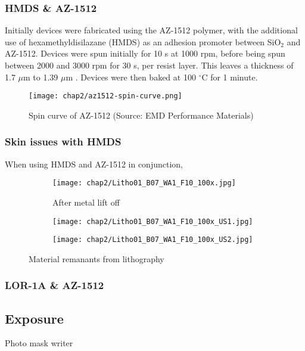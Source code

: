 \documentclass[../Matt_Gebert_Honours_Thesis.tex]{subfiles}
\begin{document}
	\subsubsection{HMDS \& AZ-1512}
		Initially devices were fabricated using the AZ-1512 polymer, with the additional use of hexamethyldisilazane (HMDS) as an adhesion promoter between SiO$_2$ and AZ-1512. Devices were spun initially for 10 s at 1000 rpm, before being spun between 2000 and 3000 rpm for 30 s, per resist layer. This leaves a thickness of 1.7 $\mu$m to 1.39 $\mu$m \cite{az1500_series}.
		Devices were then baked at 100 $^\circ$C for 1 minute.
	
	\begin{figure}[H]\label{fig:spin_curve_AZ-1512}
		\centering
		\texttt{[image: chap2/az1512-spin-curve.png]}
		\caption{Spin curve of AZ-1512 (Source: EMD Performance Materials\cite{az1500_series_spincurve})}
	\end{figure}
	
	\subsubsection{Skin issues with HMDS}
	When using HMDS and AZ-1512 in conjunction, 
	
	
	\begin{figure}[H]\label{fig:lithography_skins}
		\centering
		\begin{subfigure}[b]{0.3\textwidth}
			\texttt{[image: chap2/Litho01\_B07\_WA1\_F10\_100x.jpg]}
			\caption{After metal lift off}			
		\end{subfigure}
		\begin{subfigure}[b]{0.3\textwidth}
			\texttt{[image: chap2/Litho01\_B07\_WA1\_F10\_100x\_US1.jpg]}
		\end{subfigure}
		\begin{subfigure}[b]{0.3\textwidth}
			\texttt{[image: chap2/Litho01\_B07\_WA1\_F10\_100x\_US2.jpg]}
		\end{subfigure}
		\caption{Material remanants from lithography}
	\end{figure}
	
	\subsubsection{LOR-1A \& AZ-1512}
	
	\subsection{Exposure}\label{sec:exposure}
		Photo mask writer
	
\end{document}
